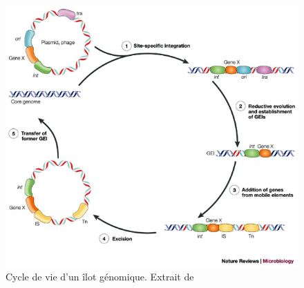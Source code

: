 \begin{figure}[htbp]
    \centering
    \includegraphics[width=0.8\linewidth]{images/cycle_GI.png}
    \caption[Cycle de vie d'un îlot génomique]{Cycle de vie d'un îlot génomique. Extrait de \cite{dobrindt_genomic_2004}}
    \label{fig:cycle_IG}
\end{figure}